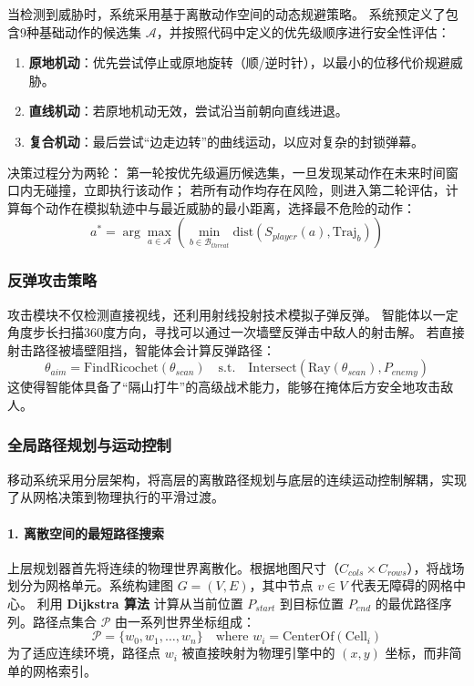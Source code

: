 \documentclass[conference]{IEEEtran}
\begin{document}
当检测到威胁时，系统采用基于离散动作空间的动态规避策略。
系统预定义了包含9种基础动作的候选集 $\mathcal{A}$，并按照代码中定义的优先级顺序进行安全性评估：
\begin{enumerate}
    \item \textbf{原地机动}：优先尝试停止或原地旋转（顺/逆时针），以最小的位移代价规避威胁。
    \item \textbf{直线机动}：若原地机动无效，尝试沿当前朝向直线进退。
    \item \textbf{复合机动}：最后尝试“边走边转”的曲线运动，以应对复杂的封锁弹幕。
\end{enumerate}
决策过程分为两轮：
第一轮按优先级遍历候选集，一旦发现某动作在未来时间窗口内无碰撞，立即执行该动作；
若所有动作均存在风险，则进入第二轮评估，计算每个动作在模拟轨迹中与最近威胁的最小距离，选择最不危险的动作：
\begin{equation}
    a^* = \arg\max_{a \in \mathcal{A}} \left( \min_{b \in \mathcal{B}_{threat}} \text{dist}(S_{player}(a), \text{Traj}_b) \right)
\end{equation}

\subsubsection{反弹攻击策略}
攻击模块不仅检测直接视线，还利用射线投射技术模拟子弹反弹。
智能体以一定角度步长扫描360度方向，寻找可以通过一次墙壁反弹击中敌人的射击解。
若直接射击路径被墙壁阻挡，智能体会计算反弹路径：
\begin{equation}
    \theta_{aim} = \text{FindRicochet}(\theta_{scan}) \quad \text{s.t.} \quad \text{Intersect}(\text{Ray}(\theta_{scan}), P_{enemy})
\end{equation}
这使得智能体具备了“隔山打牛”的高级战术能力，能够在掩体后方安全地攻击敌人。

\subsubsection{全局路径规划与运动控制}
移动系统采用分层架构，将高层的离散路径规划与底层的连续运动控制解耦，实现了从网格决策到物理执行的平滑过渡。

\paragraph{1. 离散空间的最短路径搜索}
上层规划器首先将连续的物理世界离散化。根据地图尺寸（$C_{cols} \times C_{rows}$），将战场划分为网格单元。系统构建图 $G=(V, E)$，其中节点 $v \in V$ 代表无障碍的网格中心。
利用 \textbf{Dijkstra 算法} 计算从当前位置 $P_{start}$ 到目标位置 $P_{end}$ 的最优路径序列。路径点集合 $\mathcal{P}$ 由一系列世界坐标组成：
\begin{equation}
    \mathcal{P} = \{ w_0, w_1, \dots, w_n \} \quad \text{where } w_i = \text{CenterOf}(\text{Cell}_i)
\end{equation}
为了适应连续环境，路径点 $w_i$ 被直接映射为物理引擎中的 $(x, y)$ 坐标，而非简单的网格索引。
\end{document}
